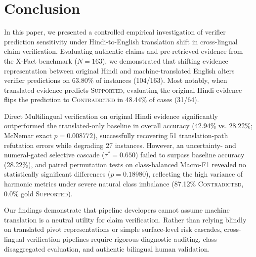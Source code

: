 \section{Conclusion}
\label{sec:conclusion}

In this paper, we presented a controlled empirical investigation of verifier prediction sensitivity under Hindi-to-English translation shift in cross-lingual claim verification. Evaluating authentic claims and pre-retrieved evidence from the X-Fact benchmark ($N=163$), we demonstrated that shifting evidence representation between original Hindi and machine-translated English alters verifier predictions on 63.80\% of instances (104/163). Most notably, when translated evidence predicts \textsc{Supported}, evaluating the original Hindi evidence flips the prediction to \textsc{Contradicted} in 48.44\% of cases (31/64).

Direct Multilingual verification on original Hindi evidence significantly outperformed the translated-only baseline in overall accuracy (42.94\% vs. 28.22\%; McNemar exact $p = 0.008772$), successfully recovering 51 translation-path refutation errors while degrading 27 instances. However, an uncertainty- and numeral-gated selective cascade ($\tau^*=0.650$) failed to surpass baseline accuracy (28.22\%), and paired permutation tests on class-balanced Macro-F1 revealed no statistically significant differences ($p = 0.18980$), reflecting the high variance of harmonic metrics under severe natural class imbalance (87.12\% \textsc{Contradicted}, 0.0\% gold \textsc{Supported}).

Our findings demonstrate that pipeline developers cannot assume machine translation is a neutral utility for claim verification. Rather than relying blindly on translated pivot representations or simple surface-level risk cascades, cross-lingual verification pipelines require rigorous diagnostic auditing, class-disaggregated evaluation, and authentic bilingual human validation.
